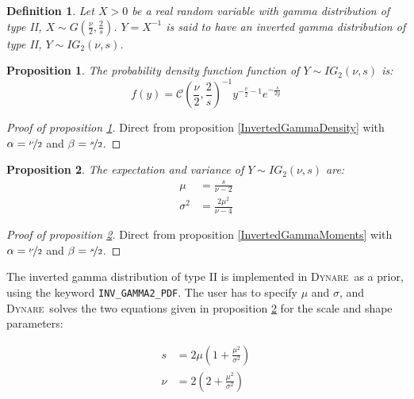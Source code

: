 \documentclass{amsart}
\theoremstyle{plain}
\newtheorem{proposition}{Proposition}[section]
\newtheorem{definition}{Definition}[section]
\theoremstyle{remark}
\numberwithin{equation}{section}
\newcommand{\Dynare}{\textsc{Dynare}}
\begin{document}
\begin{definition}\label{InvertedGamma2}
  Let $X>0$ be a real random variable with gamma distribution of type II,
  $X\sim G\left(\frac{\nu}{2},\frac{2}{s}\right)$. $Y = X^{-1}$ is
  said to have an inverted gamma distribution of type II,
  $Y\sim IG_2(\nu, s)$.
\end{definition}

\begin{proposition}\label{InvertedGamma2Density}
  The probability density function function of $Y\sim IG_2(\nu, s)$ is:
  \[
    f(y) = \mathcal C\left(\frac{\nu}{2}, \frac{2}{s}\right)^{-1}y^{-\frac{\nu}{2}-1}e^{-\frac{s}{2 y}}
  \]
\end{proposition}

\begin{proof}[Proof of proposition \ref{InvertedGamma2Density}]
  Direct from proposition \ref{InvertedGammaDensity} with $\alpha=\nicefrac{\nu}{2}$ and $\beta=\nicefrac{s}{2}$.
\end{proof}

\begin{proposition}\label{InvertedGamma2Moments}
  The expectation and variance of $Y\sim IG_2(\nu, s)$ are:
  \[
    \begin{split}
      \mu &= \frac{s}{\nu-2}\\
      \sigma^2 &= \frac{2\mu^2}{\nu-4}
    \end{split}
  \]
\end{proposition}

\begin{proof}[Proof of proposition \ref{InvertedGamma2Moments}]
  Direct from proposition \ref{InvertedGammaMoments} with $\alpha=\nicefrac{\nu}{2}$ and $\beta=\nicefrac{s}{2}$.
\end{proof}

The inverted gamma distribution of type II is implemented in \Dynare\ as a prior, using the
keyword \verb+INV_GAMMA2_PDF+. The user has to specify $\mu$ and $\sigma$, and \Dynare\ solves the
two equations given in proposition \ref{InvertedGamma2Moments} for the scale and shape parameters:

\begin{equation}
  \begin{split}
    s &= 2\mu\left(1+\frac{\mu^2}{\sigma^2}\right)\\
    \nu &= 2\left(2+\frac{\mu^2}{\sigma^2}\right)
  \end{split}
\end{equation}
\end{document}

